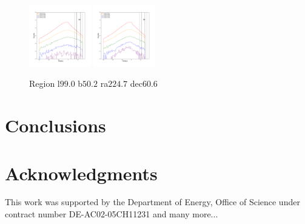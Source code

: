 \documentclass[12pt,prd]{article}
\begin{document}
\begin{figure}[h!]
\includegraphics[width=0.24\textwidth]{../figures/scanning_plotsgaiascan_l99_0_b50_2_ra224_7_dec60_6_npy_16.pdf}
\includegraphics[width=0.24\textwidth]{../figures/scanning_plotsgaiascan_l99_0_b50_2_ra224_7_dec60_6_npy_17.pdf}
\caption{Region l$99.0$ b$50.2$ ra$224.7$ dec$60.6$}
\end{figure}

\section{Conclusions} \label{sec:conclusions}


\section*{\label{sec::acknowledgments}Acknowledgments}

This work was supported by the Department of Energy, Office of Science under contract number DE-AC02-05CH11231 and many more...



\end{document}
